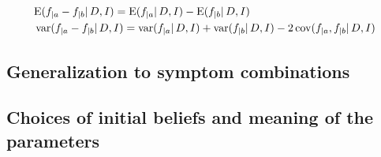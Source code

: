 \documentclass[\ifafour a4paper,12pt,\else a5paper,10pt,\fi%
onecolumn,oneside,article,%
british%
]{memoir}
\theoremstyle{remark}
\theoremstyle{innote}
\newcommand*{\citep}{\parencites}
\newcommand*{\pf}{\mathrm{p}}%
\renewcommand*{\|}{\mathpunct{|}}
\newcommand*{\eqns}{eqs}%
\newcommand*{\E}{\mathrm{E}}
\DeclarePairedDelimiter\expp{(}{)}
\newcommand*{\expe}{\E\expp}%
\newcommand*{\puzzle}{\maltese}
\newcommand{\mynote}[1]{ {\color{notecolour}\puzzle\ #1}}
\DeclareMathOperator{\cov}{cov}
\DeclareMathOperator{\var}{var}
\newcommand*{\yD}{D}
\newcommand*{\yI}{I}
\newcommand*{\ya}{a}
\newcommand*{\yb}{b}
\newcommand*{\dbeta}{\betaup}
\newcommand*{\yua}{u}
\newcommand*{\yub}{v}
\newcommand*{\yuam}{\yua_{\text{M}}}
\newcommand*{\yubm}{\yub_{\text{M}}}
\begin{document}
  \begin{align}
    \label{eq:mean_final_diff}
    &\expe{f_{|\ya}- f_{|\yb} \| \yD, \yI} =
    \expe{f_{|\ya} \| \yD, \yI} -
    \expe{ f_{|\yb} \| \yD, \yI}
    \\
    \label{eq:cov_final_diff}
    &\var(f_{|\ya}- f_{|\yb} \| \yD, \yI) =
    \var(f_{|\ya} \| \yD, \yI) +
    \var(f_{|\yb} \| \yD, \yI) -
    2\cov(f_{|\ya},f_{|\yb} \| \yD, \yI)
  \end{align}












\subsection{Generalization to symptom combinations}
\label{sec:generalization_symptom_combinations}




\subsection{Choices of initial beliefs and meaning of the parameters}
\label{sec:choices_prior_info}
\end{document}
